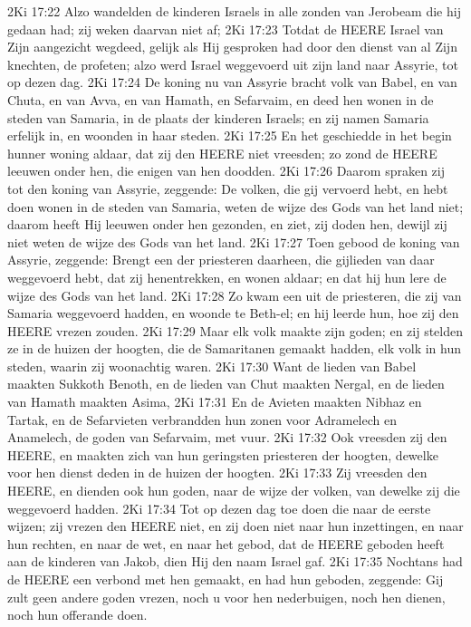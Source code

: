 2Ki 17:22  Alzo wandelden de kinderen Israels in alle zonden van Jerobeam die hij gedaan had; zij weken daarvan niet af;
2Ki 17:23  Totdat de HEERE Israel van Zijn aangezicht wegdeed, gelijk als Hij gesproken had door den dienst van al Zijn knechten, de profeten; alzo werd Israel weggevoerd uit zijn land naar Assyrie, tot op dezen dag.
2Ki 17:24  De koning nu van Assyrie bracht volk van Babel, en van Chuta, en van Avva, en van Hamath, en Sefarvaim, en deed hen wonen in de steden van Samaria, in de plaats der kinderen Israels; en zij namen Samaria erfelijk in, en woonden in haar steden.
2Ki 17:25  En het geschiedde in het begin hunner woning aldaar, dat zij den HEERE niet vreesden; zo zond de HEERE leeuwen onder hen, die enigen van hen doodden.
2Ki 17:26  Daarom spraken zij tot den koning van Assyrie, zeggende: De volken, die gij vervoerd hebt, en hebt doen wonen in de steden van Samaria, weten de wijze des Gods van het land niet; daarom heeft Hij leeuwen onder hen gezonden, en ziet, zij doden hen, dewijl zij niet weten de wijze des Gods van het land.
2Ki 17:27  Toen gebood de koning van Assyrie, zeggende: Brengt een der priesteren daarheen, die gijlieden van daar weggevoerd hebt, dat zij henentrekken, en wonen aldaar; en dat hij hun lere de wijze des Gods van het land.
2Ki 17:28  Zo kwam een uit de priesteren, die zij van Samaria weggevoerd hadden, en woonde te Beth-el; en hij leerde hun, hoe zij den HEERE vrezen zouden.
2Ki 17:29  Maar elk volk maakte zijn goden; en zij stelden ze in de huizen der hoogten, die de Samaritanen gemaakt hadden, elk volk in hun steden, waarin zij woonachtig waren.
2Ki 17:30  Want de lieden van Babel maakten Sukkoth Benoth, en de lieden van Chut maakten Nergal, en de lieden van Hamath maakten Asima,
2Ki 17:31  En de Avieten maakten Nibhaz en Tartak, en de Sefarvieten verbrandden hun zonen voor Adramelech en Anamelech, de goden van Sefarvaim, met vuur.
2Ki 17:32  Ook vreesden zij den HEERE, en maakten zich van hun geringsten priesteren der hoogten, dewelke voor hen dienst deden in de huizen der hoogten.
2Ki 17:33  Zij vreesden den HEERE, en dienden ook hun goden, naar de wijze der volken, van dewelke zij die weggevoerd hadden.
2Ki 17:34  Tot op dezen dag toe doen die naar de eerste wijzen; zij vrezen den HEERE niet, en zij doen niet naar hun inzettingen, en naar hun rechten, en naar de wet, en naar het gebod, dat de HEERE geboden heeft aan de kinderen van Jakob, dien Hij den naam Israel gaf.
2Ki 17:35  Nochtans had de HEERE een verbond met hen gemaakt, en had hun geboden, zeggende: Gij zult geen andere goden vrezen, noch u voor hen nederbuigen, noch hen dienen, noch hun offerande doen.

